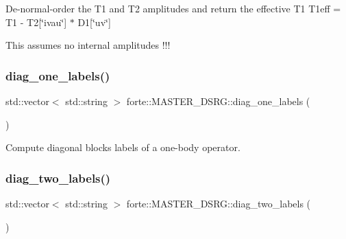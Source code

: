 De-\/normal-\/order the T1 and T2 amplitudes and return the effective T1 T1eff = T1 -\/ T2\mbox{[}\char`\"{}ivau\char`\"{}\mbox{]} $\ast$ D1\mbox{[}\char`\"{}uv\char`\"{}\mbox{]}

This assumes no internal amplitudes !!! \mbox{\label{classforte_1_1_m_a_s_t_e_r___d_s_r_g_a033c9c47a263276b244f785ff17eb021}} 
\subsubsection{\texorpdfstring{diag\+\_\+one\+\_\+labels()}{diag\_one\_labels()}}
{\footnotesize\ttfamily std\+::vector$<$ std\+::string $>$ forte\+::\+M\+A\+S\+T\+E\+R\+\_\+\+D\+S\+R\+G\+::diag\+\_\+one\+\_\+labels (\begin{DoxyParamCaption}{ }\end{DoxyParamCaption})\hspace{0.3cm}{\ttfamily [protected]}}



Compute diagonal blocks labels of a one-\/body operator. 

\mbox{\label{classforte_1_1_m_a_s_t_e_r___d_s_r_g_a952117c90bb81a025be16810cd8362c8}} 
\subsubsection{\texorpdfstring{diag\+\_\+two\+\_\+labels()}{diag\_two\_labels()}}
{\footnotesize\ttfamily std\+::vector$<$ std\+::string $>$ forte\+::\+M\+A\+S\+T\+E\+R\+\_\+\+D\+S\+R\+G\+::diag\+\_\+two\+\_\+labels (\begin{DoxyParamCaption}{ }\end{DoxyParamCaption})\hspace{0.3cm}{\ttfamily [protected]}}



